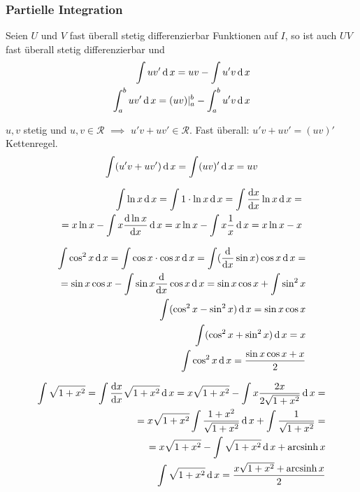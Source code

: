 \subsubsection{Partielle Integration}
\begin{Sat}
  Seien $U$ und $V$ fast überall stetig differenzierbar Funktionen auf $I$, so ist auch $UV$ fast überall stetig differenzierbar und
  \begin{align*}
    \int uv'\operatorname{d} x=uv-\int u'v\operatorname{d} x\\
    \int^b_auv'\operatorname{d} x=(uv)|^b_a-\int^b_au'v\operatorname{d} x
  \end{align*}
\end{Sat}
\begin{Bew}
  $u,v$ stetig und $u,v\in\mathcal{R}$ $\implies$ $u'v+uv'\in\mathcal{R}$. Fast überall: $u'v+uv'=(uv)'$ Kettenregel.
  \begin{align*}
    \int(u'v+uv')\operatorname{d} x=\int(uv)'\operatorname{d} x=uv
  \end{align*}
\end{Bew}
\begin{Bsp}
  \begin{align*}
    \int\ln x\operatorname{d} x=\int 1 \cdot \ln x \operatorname{d} x=\int\displaystyle\frac{\mathrm{d}x}{\mathrm{d}x}\ln x\operatorname{d} x=\\
    =x\ln x-\int x\displaystyle\frac{\mathrm{d}\ln x}{\mathrm{d}x} \operatorname{d} x=x\ln x-\int x\frac{1}{x}\operatorname{d} x=x\ln x-x
  \end{align*}
\end{Bsp}
\begin{Bsp}
  \begin{align*}
    \int \cos^2x\operatorname{d} x=\int \cos x \cdot \cos x\operatorname{d} x = \int(\displaystyle\frac{\mathrm{d}}{\mathrm{d}x}\sin x)\cos x \operatorname{d} x=\\
    =\sin x \cos x -\int \sin x \displaystyle\frac{\mathrm{d}}{\mathrm{d}x}\cos x \operatorname{d} x = \sin x \cos x +\int \sin^2 x\\
    \int(\cos^2x-\sin^2x)\operatorname{d} x = \sin x \cos x\\
    \int(\cos^2x+\sin^2x)\operatorname{d} x = x\\
    \int \cos^2x\operatorname{d} x=\frac{\sin x\cos x+ x}{2}
  \end{align*}
\end{Bsp}
\begin{Bsp}
  \begin{align*}
    \int\sqrt{1+x^2}=\int\displaystyle\frac{\mathrm{d}x}{\mathrm{d}x}\sqrt{1+x^2}\operatorname{d} x=x\sqrt{1+x^2}-\int x\frac{2x}{2\sqrt{1+x^2}}\operatorname{d} x=\\
    =x\sqrt{1+x^2} \int\frac{1+x^2}{\sqrt{1+x^2}}\operatorname{d} x+\int\frac{1}{\sqrt{1+x^2}}=\\
    =x\sqrt{1+x^2}-\int\sqrt{1+x^2}\operatorname{d} x+\operatorname{arcsinh} x\\
    \int\sqrt{1+x^2}\operatorname{d} x=\frac{x\sqrt{1+x^2}+\operatorname{arcsinh} x}{2}
  \end{align*}
\end{Bsp}

